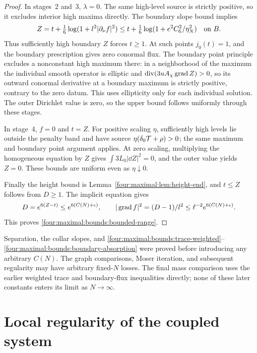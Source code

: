 \begin{proof}
In stages~2 and~3, $\lambda=0$. The same high-level source is
strictly positive, so it excludes interior high maxima directly.
The boundary slope bound implies
\[
 Z=t+\tfrac16\log(1+l^2|\partial_\nu f|^2)
       \le t+\tfrac16\log(1+e^2 C_6^2/\eta_N^2)
       \quad\hbox{on }B.
\]
Thus sufficiently high boundary $Z$ forces $t\ge1$. At such points
$j_0(t)=1$, and the boundary prescription gives zero conormal flux.
The boundary point principle excludes a nonconstant high maximum
there: in a neighborhood of the maximum the individual smooth
operator is elliptic and $\operatorname{div}(3uA_\chi\operatorname{grad} Z)>0$, so its outward
conormal derivative at a boundary maximum is strictly positive,
contrary to the zero datum. This uses ellipticity only for each
individual solution. The outer Dirichlet value is zero, so the upper
bound follows uniformly through these stages.

In stage~4, $f=0$ and $t=Z$. For positive scaling $\eta$, sufficiently
high levels lie outside the penalty band and have source
$\eta(\delta_0\mathcal T+\rho)>0$; the same maximum and boundary point
argument applies. At zero scaling, multiplying the homogeneous
equation by $Z$ gives $\int 3L_0|\dd Z|^2=0$, and the outer value yields
$Z=0$. These bounds are uniform even as $\eta\downarrow0$.

Finally the height bound is Lemma~\ref{four:maximal:lem:height-end}, and
$t\le Z$ follows from $D\ge1$. The implicit equation gives
\[
 D=e^{6(Z-t)}\le e^{6(C(N)+\epsilon)},\qquad
 |\operatorname{grad} f|^2=(D-1)/l^2\le\ell^{-2}e^{6(C(N)+\epsilon)}.
\]
This proves \eqref{four:maximal:bounds:bounded-range}.
\end{proof}

\begin{remark}\label{four:maximal:bounds:parameter-order}
Separation, the collar slopes, and
\eqref{four:maximal:bounds:trace-weighted}--\eqref{four:maximal:bounds:boundary-absorption}
were proved before introducing any arbitrary $C(N)$.
The graph comparisons, Moser iteration, and subsequent regularity
may have arbitrary fixed-$N$ losses. The final mass comparison uses
the earlier weighted trace and boundary-flux inequalities directly;
none of these later constants enters its limit as $N\to\infty$.
\end{remark}

\section{Local regularity of the coupled system}\label{four:maximal:sec:regularity}

